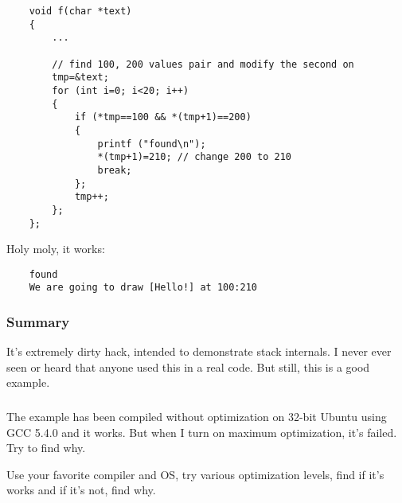 \begin{lstlisting}
	void f(char *text)
	{
		...

		// find 100, 200 values pair and modify the second on
		tmp=&text;
		for (int i=0; i<20; i++)
		{
			if (*tmp==100 && *(tmp+1)==200)
			{
				printf ("found\n");
				*(tmp+1)=210; // change 200 to 210
				break;
			};
			tmp++;
		};
	};
\end{lstlisting}

Holy moly, it works:

\begin{lstlisting}
	found
	We are going to draw [Hello!] at 100:210
\end{lstlisting}

\subsubsection{Summary}

It's extremely dirty hack, intended to demonstrate stack internals.
I never ever seen or heard that anyone used this in a real code.
But still, this is a good example.

\subsubsection{\Exercise}

The example has been compiled without optimization on 32-bit Ubuntu using GCC 5.4.0 and it works.
But when I turn on  maximum optimization, it's failed.
Try to find why.

Use your favorite compiler and OS, try various optimization levels, find if it's works and if it's not, find why.


